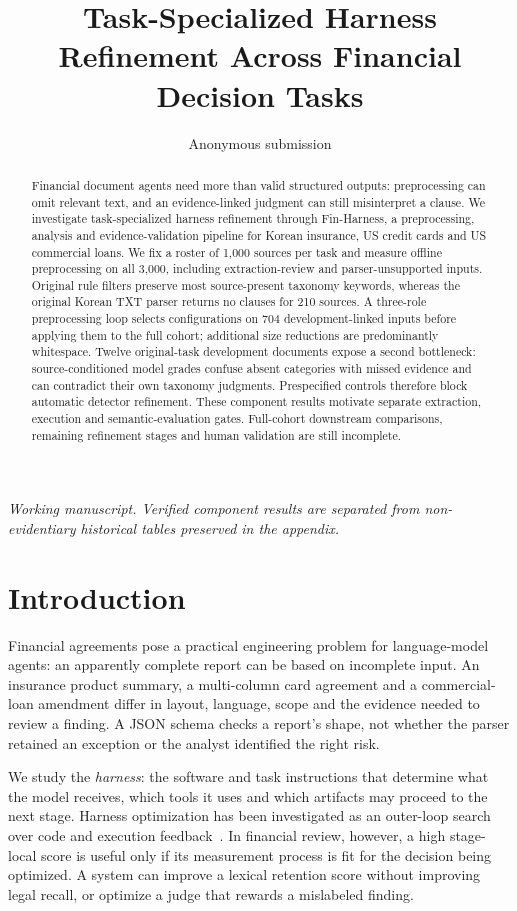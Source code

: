\documentclass[11pt]{article}
\title{Task-Specialized Harness Refinement Across Financial Decision Tasks}
\author{Anonymous submission}
\begin{document}
\maketitle

\begin{abstract}
Financial document agents need more than valid structured outputs:
preprocessing can omit relevant text, and an evidence-linked judgment can
still misinterpret a clause. We investigate task-specialized harness
refinement through Fin-Harness, a preprocessing, analysis and
evidence-validation pipeline for Korean insurance, US credit cards and
US commercial loans. We fix a roster of 1,000 sources per task and
measure offline preprocessing on all 3,000, including extraction-review
and parser-unsupported inputs. Original rule filters preserve most
source-present taxonomy keywords, whereas the original Korean TXT parser
returns no clauses for 210 sources. A three-role preprocessing loop
selects configurations on 704 development-linked inputs before applying
them to the full cohort; additional size reductions are predominantly
whitespace. Twelve original-task development documents expose a second
bottleneck: source-conditioned model grades confuse absent categories
with missed evidence and can contradict their own taxonomy judgments.
Prespecified controls therefore block automatic detector refinement.
These component results motivate separate extraction, execution and
semantic-evaluation gates. Full-cohort downstream comparisons, remaining
refinement stages and human validation are still incomplete.
\end{abstract}

\noindent\textit{Working manuscript. Verified component results are separated
from non-evidentiary historical tables preserved in the appendix.}

\section{Introduction}
Financial agreements pose a practical engineering problem for language-model
agents: an apparently complete report can be based on incomplete input.
An insurance product summary, a multi-column card agreement and a
commercial-loan amendment differ in layout, language, scope and the evidence
needed to review a finding. A JSON schema checks a report's shape, not whether
the parser retained an exception or the analyst identified the right risk.

We study the \emph{harness}: the software and task instructions that determine
what the model receives, which tools it uses and which artifacts may proceed
to the next stage. Harness optimization has been investigated as an outer-loop
search over code and execution feedback~\citep{lee2026metaharness,
lou2026autoharnessimprovingllmagentsimprovingllmagents}. In financial review,
however, a high stage-local score is useful only if its measurement process
is fit for the decision being optimized. A system can improve a lexical
retention score without improving legal recall, or optimize a judge that
rewards a mislabeled finding.
\end{document}

